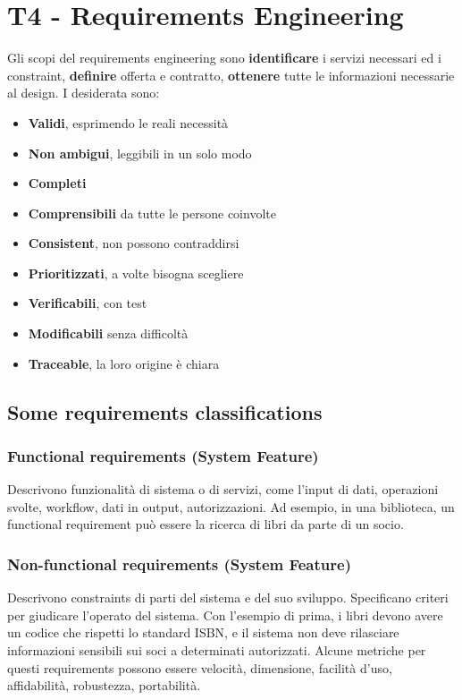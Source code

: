 \documentclass[11pt]{article}
\begin{document}
\section{T4 - Requirements Engineering}
Gli scopi del requirements engineering sono \textbf{identificare} i servizi necessari ed i constraint, \textbf{definire} offerta e contratto, \textbf{ottenere} tutte le informazioni necessarie al design. I desiderata sono:
\begin{itemize}
    \item \textbf{Validi}, esprimendo le reali necessità
    \item \textbf{Non ambigui}, leggibili in un solo modo 
    \item \textbf{Completi}
    \item \textbf{Comprensibili} da tutte le persone coinvolte 
    \item \textbf{Consistent}, non possono contraddirsi 
    \item \textbf{Prioritizzati}, a volte bisogna scegliere
    \item \textbf{Verificabili}, con test 
    \item \textbf{Modificabili} senza difficoltà
    \item \textbf{Traceable}, la loro origine è chiara
\end{itemize}
\subsection{Some requirements classifications}
\subsubsection{Functional requirements (System Feature)}
Descrivono funzionalità di sistema o di servizi, come l'input di dati, operazioni svolte, workflow, dati in output, autorizzazioni. Ad esempio, in una biblioteca, un functional requirement può essere la ricerca di libri da parte di un socio.
\subsubsection{Non-functional requirements (System Feature)}
Descrivono \glspl{constraint} di parti del sistema e del suo sviluppo. Specificano criteri per giudicare l'operato del sistema. Con l'esempio di prima, i libri devono avere un codice che rispetti lo standard ISBN, e il sistema non deve rilasciare informazioni sensibili sui soci a determinati autorizzati. 
Alcune metriche per questi requirements possono essere velocità, dimensione, facilità d'uso, affidabilità, robustezza, portabilità.
\end{document}
